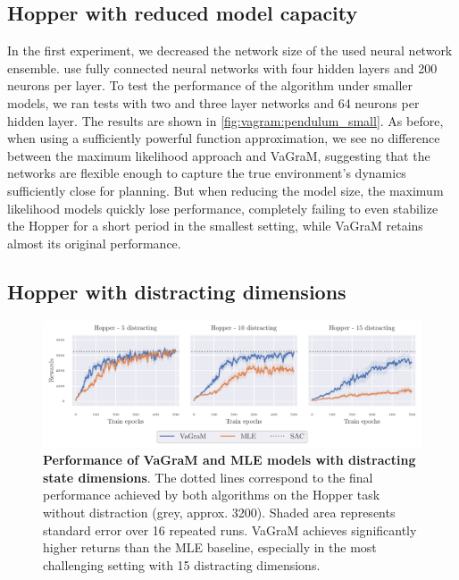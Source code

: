 \subsection{Hopper with reduced model capacity}
In the first experiment, we decreased the network size of the used neural network ensemble.
\textcite{janner2019mbpo} use fully connected neural networks with four hidden layers and 200 neurons per layer.
To test the performance of the algorithm under smaller models, we ran tests with two and three layer networks and 64 neurons per hidden layer.
The results are shown in \autoref{fig:vagram:pendulum_small}.
As before, when using a sufficiently powerful function approximation, we see no difference between the maximum likelihood approach and VaGraM, suggesting that the networks are flexible enough to capture the true environment's dynamics sufficiently close for planning.
But when reducing the model size, the maximum likelihood models quickly lose performance, completely failing to even stabilize the Hopper for a short period in the smallest setting, while VaGraM retains almost its original performance.

\subsection{Hopper with distracting dimensions}


\begin{figure}[t]
    \includegraphics[clip, trim=0.2cm 0.0cm 0.4cm 0.0cm, width=1.\linewidth]{figures/vagram/fig_1.pdf}
    \caption{\textbf{Performance of VaGraM and MLE models with distracting state dimensions}. The dotted lines correspond to the final performance achieved by both algorithms on the Hopper task without distraction (grey, approx. 3200). Shaded area represents standard error over 16 repeated runs. VaGraM achieves significantly higher returns than the MLE baseline, especially in the most challenging setting with 15 distracting dimensions.}
    \label{fig:vagram:pendulum_distraction}
\end{figure}

